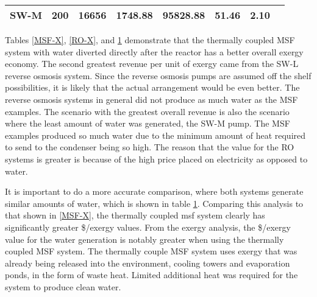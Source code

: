 \begin{table}[h!]
\begin{tabular}{|l|l|l|l|l|l|l|l|}
SW-M                                                                                  & 200                                                                                     & 16656                                                                                          & 1748.88                                                                            & 95828.88                                                                            & 51.46              & 2.10                                                               \\ \hline
\end{tabular}
\label{RO-H20}
\end{table}

Tables \ref{MSF-X}, \ref{RO-X}, and \ref{RO-H20} demonstrate that the thermally coupled MSF system with water diverted directly after the reactor has a better overall exergy economy.  The second greatest revenue per unit of exergy came from the SW-L reverse osmosis system. Since the reverse osmosis pumps are assumed off the shelf possibilities, it is likely that the actual arrangement would be even better.  The reverse osmosis systems in general did not produce as much water as the MSF examples. The scenario with the greatest overall revenue is also the scenario where the least amount of water was generated, the SW-M pump. The MSF examples produced so much water due to the minimum amount of heat required to send to the condenser being so high.  The reason that the value for the RO systems is greater is because of the high price placed on electricity as opposed to water. 

It is important to do a more accurate comparison, where both systems generate similar amounts of water, which is shown in table \ref{RO-H20}.  Comparing this analysis to that shown in \ref{MSF-X}, the thermally coupled msf system clearly has significantly greater \$/exergy values.  From the exergy analysis, the \$/exergy value for the water generation is notably greater when using the thermally coupled MSF system.  The thermally couple MSF system uses exergy that was already being released into the environment, cooling towers and evaporation ponds, in the form of waste heat. Limited additional heat was required for the system to produce clean water.


